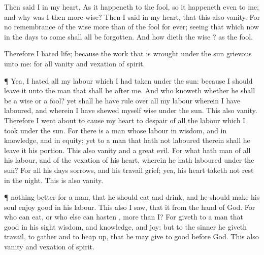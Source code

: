 {Then
said I in my
heart, As it
happeneth to the
fool, so it
happeneth even to
me; and why was I then
more
wise? Then I
said in my
heart, that this also
{}
vanity.
For
{} no
remembrance of the
wise more
than of the
fool for
ever; seeing that which
now
{} in the
days to
come shall all be
forgotten. And how
dieth the
wise
{}? as the
fool.
\par }{\PP {}Therefore I
hated
life; because the
work that is
wrought under the
sun
{}
grievous unto me: for all
{}
vanity and
vexation of
spirit.
\par }{\PP {}¶ Yea, I
hated all my
labour which I had
taken under the
sun: because I should
leave it unto the
man that shall be
after me.
And who
knoweth whether he shall be a
wise
{} or a
fool? yet shall he have
rule over all my
labour wherein I have
laboured, and wherein I have shewed myself
wise under the
sun. This
{} also
vanity.
Therefore I went
about to
cause my
heart to
despair of all the
labour which I
took under the
sun.
For there
is a
man whose
labour
{} in
wisdom, and in
knowledge, and in
equity; yet to a
man that hath not
laboured therein shall he
leave it
{} his
portion. This also
{}
vanity and a
great
evil.
For what
hath
man of all his
labour, and of the
vexation of his
heart,
wherein he hath
laboured under the
sun?
For all his
days
{}
sorrows, and his
travail
grief; yea, his
heart taketh not
rest in the
night. This is also
vanity.
\par }{\PP {}¶
{} nothing
better for a
man,
{} that he should
eat and
drink, and
{} he should make his
soul
enjoy
good in his
labour.
This also I
saw, that it
{} from the
hand of
God.
For who can
eat, or who else can
hasten
{},
more than I?
For
{}
giveth to a
man that
{}
good in his
sight
wisdom, and
knowledge, and
joy: but to the
sinner he
giveth
travail, to
gather and to heap
up, that he may
give to
{}
good
before
God. This also
{}
vanity and
vexation of
spirit.

}
